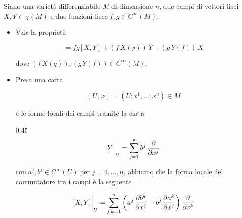 \begin{definition}
	Siano una varietà differenziabile $ M $ di dimensione $ n $, due campi di vettori lisci $ X,Y \in \chi(M) $ e due funzioni lisce $ f,g \in C^{\infty}(M) $:
	
	\begin{itemize}
		\item Vale la proprietà
		
		\begin{equation}
			[f X, g Y] = f g [X,Y] + (f \, X(g)) \, Y - (g \, Y(f)) \, X
		\end{equation}
	
		dove $ (f \, X(g)), (g \, Y(f)) \in C^{\infty}(M) $;
	
		\item Presa una carta
		
		\begin{equation}
			(U,\varphi) = (U; x^{1},\dots,x^{n}) \in M
		\end{equation}
		
		e le forme locali dei campi tramite la carta
		
			{0.45}{%
					\begin{equation}
						\eval{Y}_{U} = \sum_{j=1}^{n} b^{j} \, \pdv{x^{j}}
					\end{equation}
					}
	
		con $ a^{j},b^{j} \in C^{\infty}(U) $ per $ j=1,\dots,n $, abbiamo che la forma locale del commutatore tra i campi è la seguente
		
		\begin{equation}
			\eval{[X,Y]}_{U} = \sum_{j,k=1}^{n} \left( a^{j} \, \pdv{b^{k}}{x^{j}} - b^{j} \, \pdv{a^{k}}{x^{j}} \right) \pdv{x^{k}}
		\end{equation}
	\end{itemize}
\end{definition}

